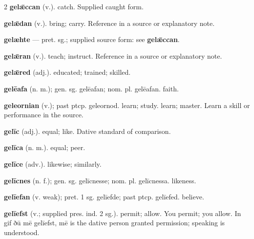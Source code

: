 \begin{multicols*}{2}
\textbf{gelǣccan} (v.). catch. Supplied caught form.\par
\textbf{gelǣdan} (v.). bring; carry. Reference in a source or explanatory note.\par
\textbf{gelæhte} — pret. sg.; supplied source form: see \textbf{gelǣccan}.\par
\textbf{gelǣran} (v.). teach; instruct. Reference in a source or explanatory note.\par
\textbf{gelǣred} (adj.). educated; trained; skilled.\par
\textbf{gelēafa} (n. m.); gen. sg. gelēafan; nom. pl. gelēafan. faith.\par
\textbf{geleornian} (v.); past ptcp. geleornod. learn; study. learn; master. Learn a skill or performance in the source.\par
\textbf{gelīc} (adj.). equal; like. Dative standard of comparison.\par
\textbf{gelīca} (n. m.). equal; peer.\par
\textbf{gelīce} (adv.). likewise; similarly.\par
\textbf{gelīcnes} (n. f.); gen. sg. gelīcnesse; nom. pl. gelīcnessa. likeness.\par
\textbf{gelīefan} (v. weak); pret. 1 sg. gelīefde; past ptcp. gelīefed. believe.\par
\textbf{gelīefst} (v.; supplied pres. ind. 2 sg.). permit; allow. You permit; you allow. In gif ðū mē gelīefst, mē is the dative person granted permission; speaking is understood.\par

\end{multicols*}

